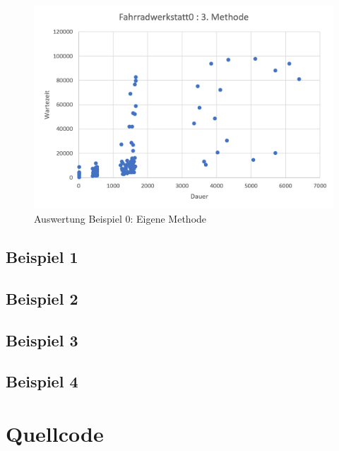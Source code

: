\documentclass[a4paper,10pt,ngerman]{scrartcl}
\begin{document}
      \begin{figure}[H]
        \centering
        \includegraphics[width=15cm]{../beispielausgaben/fahrradwerkstatt0_sta3.png}
        \caption{Auswertung Beispiel 0: Eigene Methode}
        \label{fig:Auswertung03}
      \end{figure}
    
      
    \subsection{Beispiel 1}
      
    \subsection{Beispiel 2}
      
    \subsection{Beispiel 3}
      
    \subsection{Beispiel 4}
      
  \section{Quellcode}
    
\end{document}
